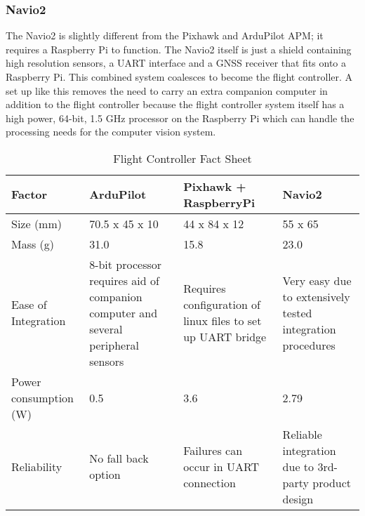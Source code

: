 		\subsubsection{Navio2}
			The Navio2 is slightly different from the Pixhawk and ArduPilot APM; it requires a Raspberry Pi to function. The Navio2 itself is just a shield containing high resolution sensors, a UART interface and a GNSS receiver that fits onto a Raspberry Pi. This combined system coalesces to become the flight controller. A set up like this removes the need to carry an extra companion computer in addition to the flight controller because the flight controller system itself has a high power, 64-bit, 1.5 GHz processor on the Raspberry Pi which can handle the processing needs for the computer vision system.

		\begin{table}[H]
			\centering
			\caption{Flight Controller Fact Sheet}
			\label{tab: flight controller}
			\begin{tabularx}{1\linewidth}{X X X X}
				\toprule
				Factor & ArduPilot & Pixhawk + RaspberryPi & Navio2 \\
			   \midrule
			   	Size (mm) & 70.5 x 45 x 10 & 44 x 84 x 12 & 55 x 65 \\
				Mass (g) & 31.0 & 15.8 & 23.0 \\
				Ease of Integration & 8-bit processor requires aid of companion \mbox{computer} and several peripheral sensors & Requires configuration of linux files to set up UART bridge & Very easy due to extensively tested integration procedures\\
				Power \newline consumption (W) & 0.5 & 3.6 & 2.79 \\
				Reliability & No fall back option & Failures can occur in UART connection & Reliable integration due to 3rd-party product \mbox{design} \\
				\bottomrule
			\end{tabularx}
		\end{table}